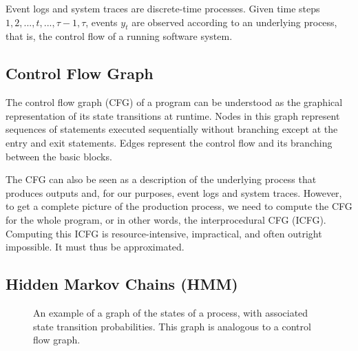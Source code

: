 Event logs and system traces are discrete-time processes. Given time steps \(1, 2, ..., t, ..., \tau - 1, \tau\),  events \(y_t\) are observed according to an underlying process, that is, the control flow of a running software system.

\subsection{Control Flow Graph}

The control flow graph (CFG) of a program can be understood as the graphical representation of its state transitions at runtime. Nodes in this graph represent sequences of statements executed sequentially without branching except at the entry and exit statements. Edges represent the control flow and its branching between the basic blocks.

The CFG can also be seen as a description of the underlying process that produces outputs and, for our purposes, event logs and system traces. However, to get a complete picture of the production process, we need to compute the CFG for the whole program, or in other words, the interprocedural CFG (ICFG). Computing this ICFG is resource-intensive, impractical, and often outright impossible. It must thus be approximated\cite{Zhao2023-nh}.

\subsection{Hidden Markov Chains (HMM)}

\begin{figure}
    \caption{An example of a graph of the states of a process, with associated state transition probabilities. This graph is analogous to a control flow graph.}
    \label{fig:state_graph}
    \vspace{2ex}
\end{figure}

